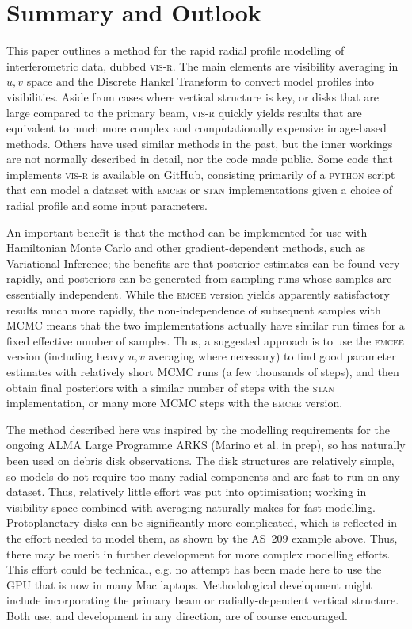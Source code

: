 \documentclass[fleqn,usenatbib]{rasti}
\begin{document}
\section{Summary and Outlook}

This paper outlines a method for the rapid radial profile modelling of interferometric data, dubbed \textsc{vis-r}. The main elements are visibility averaging in $u,v$ space and the Discrete Hankel Transform to convert model profiles into visibilities. Aside from cases where vertical structure is key, or disks that are large compared to the primary beam, \textsc{vis-r} quickly yields results that are equivalent to much more complex and computationally expensive image-based methods. Others have used similar methods in the past, but the inner workings are not normally described in detail, nor the code made public. Some code that implements \textsc{vis-r} is available on GitHub, consisting primarily of a \textsc{python} script that can model a dataset with \textsc{emcee} or \textsc{stan} implementations given a choice of radial profile and some input parameters.

An important benefit is that the method can be implemented for use with Hamiltonian Monte Carlo and other gradient-dependent methods, such as Variational Inference; the benefits are that posterior estimates can be found very rapidly, and posteriors can be generated from sampling runs whose samples are essentially independent. While the \textsc{emcee} version yields apparently satisfactory results much more rapidly, the non-independence of subsequent samples with MCMC means that the two implementations actually have similar run times for a fixed effective number of samples. Thus, a suggested approach is to use the \textsc{emcee} version (including heavy $u,v$ averaging where necessary) to find good parameter estimates with relatively short MCMC runs (a few thousands of steps), and then obtain final posteriors with a similar number of steps with the \textsc{stan} implementation, or many more MCMC steps with the \textsc{emcee} version.

The method described here was inspired by the modelling requirements for the ongoing ALMA Large Programme ARKS (Marino et al. in prep), so has naturally been used on debris disk observations. The disk structures are relatively simple, so models do not require too many radial components and are fast to run on any dataset. Thus, relatively little effort was put into optimisation; working in visibility space combined with averaging naturally makes for fast modelling. Protoplanetary disks can be significantly more complicated, which is reflected in the effort needed to model them, as shown by the AS~209 example above. Thus, there may be merit in further development for more complex modelling efforts. This effort could be technical, e.g. no attempt has been made here to use the GPU that is now in many Mac laptops. Methodological development might include incorporating the primary beam or radially-dependent vertical structure. Both use, and development in any direction, are of course encouraged.
\end{document}
